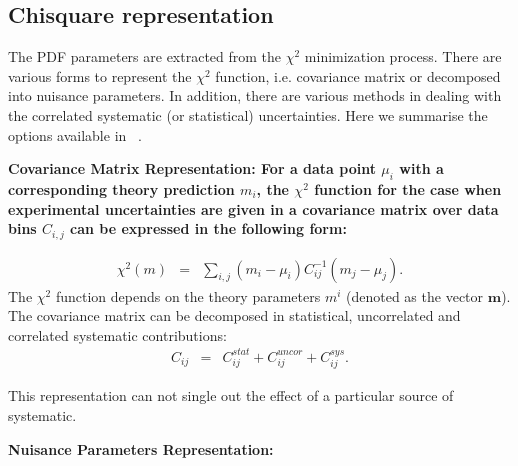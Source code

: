 \subsection{Chisquare representation}


The PDF parameters are extracted from the $\chi^2$ minimization process. 
There are various forms to represent the $\chi^2$ function, i.e. covariance matrix or decomposed into nuisance parameters. In addition, there are various methods in dealing with the correlated systematic (or statistical) uncertainties. Here we summarise the options available in \fitter\ . 

\begin{description}
\item \bf {Covariance Matrix Representation:} \rm
For a data point  $\mu_i$ with a corresponding theory prediction $m_i$, the $\chi^2$ function for the case when experimental uncertainties are given in a covariance matrix over data bins $C_{i,j}$ can be expressed in the following form:

\begin{eqnarray}
\chi^2 (m)& = & \sum_{i,j}(m_i-\mu_i)C^{-1}_{ij}(m_j-\mu_j).
\end{eqnarray}
The $\chi^2$ function depends on the theory parameters $m^i$ 
(denoted as the vector $\boldsymbol{m}$).
The covariance matrix can be decomposed in statistical, uncorrelated and correlated systematic contributions: 
\begin{eqnarray}
C_{ij}& = & C^{stat}_{ij}+C^{uncor}_{ij}+C^{sys}_{ij}.
\end{eqnarray}

This representation can not single out the effect of a particular
source of systematic.

\item \bf{Nuisance Parameters Representation:} \rm



\end{description}
